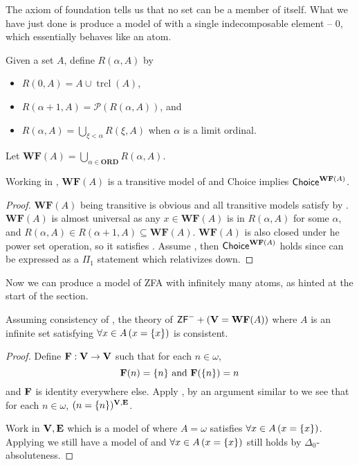 \newcommand{\WF}{\mathbf{WF}}
\newcommand{\trcl}{\operatorname{trcl}}
The axiom of foundation tells us that no set can be a member of itself.
What we have just done is produce a model of \ZFCminus with a single indecomposable element -- \(0\), which essentially behaves like an atom.

\begin{definition}
    Given a set \(A\), define \(R(\alpha,A)\) by
    \begin{itemize}
        \item \(R(0,A) = A \cup \operatorname{trcl}(A)\),
        \item \(R(\alpha+1, A) = \mathcal{P}(R(\alpha, A))\), and
        \item \(R(\alpha, A) = \bigcup_{\xi<\alpha} R(\xi, A)\) when \(\alpha\) is a limit ordinal.
    \end{itemize}
    Let \(\WF(A) = \bigcup_{\alpha\in\mathbf{ORD}} R(\alpha, A)\).
\end{definition}

\begin{lemma} \label{WFfromA}
    Working in \ZFminus, \(\WF(A)\) is a transitive model of \ZFminus and {\normalfont\textsf{Choice}} implies \({\normalfont\textsf{Choice}}^{\WF(A)}\).
\end{lemma}
\begin{proof}
    \(\WF(A)\) being transitive is obvious and all transitive models satisfy  by .
    \(\WF(A)\) is almost universal as any \(x\in\WF(A)\) is in \(R(\alpha,A)\) for some \(\alpha\),
    and \(R(\alpha,A)\in R(\alpha+1,A)\subseteq \WF(A)\).
    \(\WF(A)\) is also closed under he power set operation, so it satisfies .
    Assume , then \(\Axiom{Choice}^{\WF(A)}\) holds since  can be expressed as a \(\Pi_1\) statement which relativizes down.
\end{proof}

Now we can produce a model of \textsf{ZFA} with infinitely many atoms, as hinted at the start of the section.
\begin{theorem}
    Assuming consistency of \ZFminus, the theory of \(\ZFminus + (\V=\WF(A))\) where \(A\) is an infinite set satisfying \(\forall x\in A\left(x = {\left\{ x \right\}}\right)\) is consistent.
\end{theorem}
\begin{proof}
    Define \(\mathbf{F}:\mathbf{V}\to\mathbf{V}\) such that for each \(n\in\omega\),
    \[ \mathbf{F}(n) = {\left\{ n \right\}} \text{ and } \mathbf{F}({\left\{ n \right\}}) = n \]
    and \(\mathbf{F}\) is identity everywhere else.
    Apply , by an argument similar to  we see that for each \(n\in\omega\), \((n = {\left\{ n \right\}})^{\mathbf{V},\mathbf{E}}\).

    Work in \(\mathbf{V},\mathbf{E}\) which is a model of \ZFminus where \(A = \omega\) satisfies \(\forall x\in A\left(x = {\left\{ x \right\}}\right)\).
    Applying  we still have a model of \ZFminus and \(\forall x\in A\left(x = {\left\{ x \right\}}\right)\) still holds by \(\Delta_0\)-absoluteness.
\end{proof}

